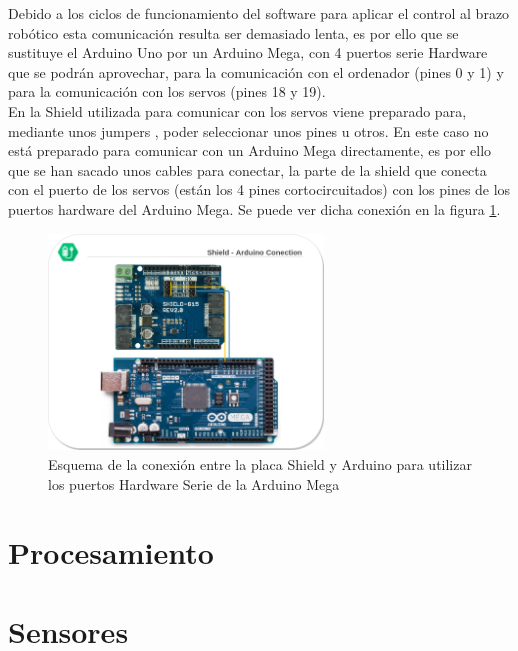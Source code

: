 	Debido a los ciclos de funcionamiento del software para aplicar el control al brazo robótico esta comunicación resulta ser demasiado lenta, es por ello que se sustituye el Arduino Uno por un Arduino Mega, con 4 puertos serie Hardware que se podrán aprovechar, para la comunicación con el ordenador (pines 0 y 1) y para la comunicación con los servos (pines 18 y 19).
	\\ 
	
	En la Shield utilizada para comunicar con los servos viene preparado para, mediante unos jumpers , poder seleccionar unos pines u otros. En este caso no está preparado para comunicar con un Arduino Mega directamente, es por ello que se han sacado unos cables para conectar, la parte de la shield que conecta con el puerto de los servos (están los 4 pines cortocircuitados) con los pines de los puertos hardware del Arduino Mega. Se puede ver dicha conexión en la figura \ref{fig:Electronica:shield-arduino}.
	
    \begin{figure}[H]
    	\centering
    	\includegraphics[width=0.65\textwidth]{figuras/Imagenes_Electronica/Shield-Arduino-Conection.png}   
    	\caption{Esquema de la conexión entre la placa Shield y Arduino para utilizar los puertos Hardware Serie de la Arduino Mega}
    	\label{fig:Electronica:shield-arduino}
    \end{figure}
\section{Procesamiento}

\section{Sensores} \label{sec:Electronica:Sensores}



